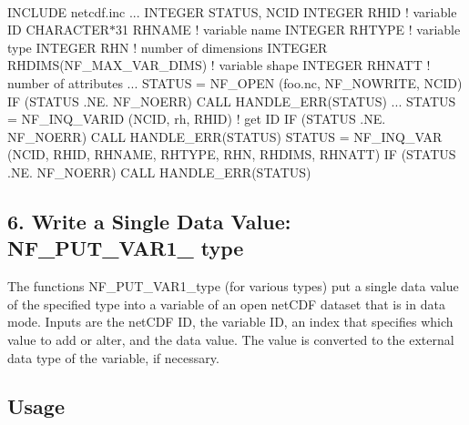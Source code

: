  

I\+N\+C\+L\+U\+DE \textquotesingle{}netcdf.\+inc\textquotesingle{} ... I\+N\+T\+E\+G\+ER S\+T\+A\+T\+US, N\+C\+ID I\+N\+T\+E\+G\+ER R\+H\+ID ! variable ID C\+H\+A\+R\+A\+C\+T\+E\+R$\ast$31 R\+H\+N\+A\+ME ! variable name I\+N\+T\+E\+G\+ER R\+H\+T\+Y\+PE ! variable type I\+N\+T\+E\+G\+ER R\+HN ! number of dimensions I\+N\+T\+E\+G\+ER R\+H\+D\+I\+M\+S(\+N\+F\+\_\+\+M\+A\+X\+\_\+\+V\+A\+R\+\_\+\+D\+I\+M\+S) ! variable shape I\+N\+T\+E\+G\+ER R\+H\+N\+A\+TT ! number of attributes ... S\+T\+A\+T\+US = N\+F\+\_\+\+O\+P\+EN (\textquotesingle{}foo.\+nc\textquotesingle{}, N\+F\+\_\+\+N\+O\+W\+R\+I\+TE, N\+C\+ID) IF (S\+T\+A\+T\+US .NE. N\+F\+\_\+\+N\+O\+E\+RR) C\+A\+LL H\+A\+N\+D\+L\+E\+\_\+\+E\+R\+R(\+S\+T\+A\+T\+U\+S) ... S\+T\+A\+T\+US = N\+F\+\_\+\+I\+N\+Q\+\_\+\+V\+A\+R\+ID (N\+C\+ID, \textquotesingle{}rh\textquotesingle{}, R\+H\+ID) ! get ID IF (S\+T\+A\+T\+US .NE. N\+F\+\_\+\+N\+O\+E\+RR) C\+A\+LL H\+A\+N\+D\+L\+E\+\_\+\+E\+R\+R(\+S\+T\+A\+T\+U\+S) S\+T\+A\+T\+US = N\+F\+\_\+\+I\+N\+Q\+\_\+\+V\+AR (N\+C\+ID, R\+H\+ID, R\+H\+N\+A\+ME, R\+H\+T\+Y\+PE, R\+HN, R\+H\+D\+I\+MS, R\+H\+N\+A\+TT) IF (S\+T\+A\+T\+US .NE. N\+F\+\_\+\+N\+O\+E\+RR) C\+A\+LL H\+A\+N\+D\+L\+E\+\_\+\+E\+R\+R(\+S\+T\+A\+T\+U\+S)

\subsection*{6. Write a Single Data Value\+: N\+F\+\_\+\+P\+U\+T\+\_\+\+V\+A\+R1\+\_\+ type }

The functions N\+F\+\_\+\+P\+U\+T\+\_\+\+V\+A\+R1\+\_\+type (for various types) put a single data value of the specified type into a variable of an open net\+C\+DF dataset that is in data mode. Inputs are the net\+C\+DF ID, the variable ID, an index that specifies which value to add or alter, and the data value. The value is converted to the external data type of the variable, if necessary.

\subsection*{Usage }

 

